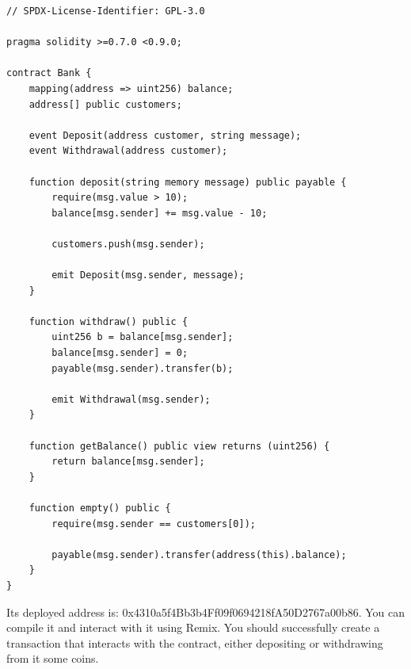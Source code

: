\documentclass[12pt,addpoints,answers]{exam}
\begin{document}
\begin{questions}
{\begin{verbatim}
// SPDX-License-Identifier: GPL-3.0

pragma solidity >=0.7.0 <0.9.0;

contract Bank {
    mapping(address => uint256) balance;
    address[] public customers;

    event Deposit(address customer, string message);
    event Withdrawal(address customer);

    function deposit(string memory message) public payable {
        require(msg.value > 10);
        balance[msg.sender] += msg.value - 10;

        customers.push(msg.sender);

        emit Deposit(msg.sender, message);
    }

    function withdraw() public {
        uint256 b = balance[msg.sender];
        balance[msg.sender] = 0;
        payable(msg.sender).transfer(b);

        emit Withdrawal(msg.sender);
    }

    function getBalance() public view returns (uint256) {
        return balance[msg.sender];
    }
    
    function empty() public {
        require(msg.sender == customers[0]);
        
        payable(msg.sender).transfer(address(this).balance);
    }
}
\end{verbatim}

} %

 Its deployed address is: 0x4310a5f4Bb3b4Ff09f0694218fA50D2767a00b86. You can compile it and interact with it using Remix. You should successfully create a transaction that interacts with the contract, either depositing or withdrawing from it some coins. 
 

\newpage

~\\

\end{questions}
\end{document}
